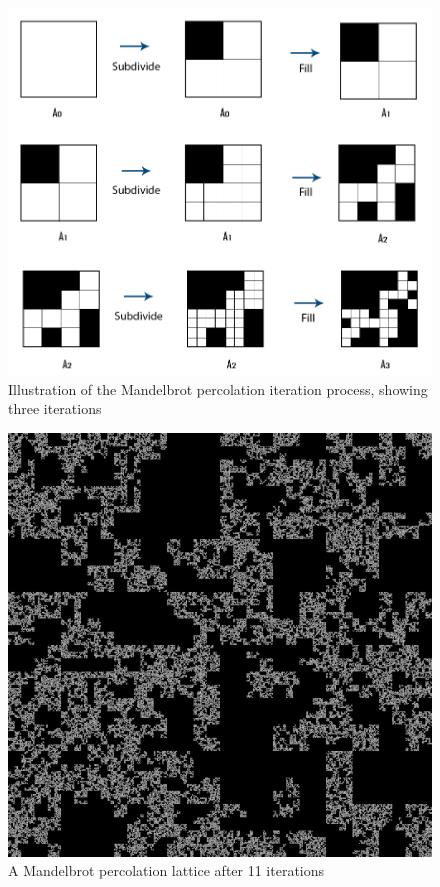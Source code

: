 \begin{figure}[H]
  \includegraphics[width=\linewidth]{Images/mandelbrot_process.png}
  \caption{Illustration of the Mandelbrot percolation iteration process, showing three iterations}
  \label{fig:mandelbrot_process}
\end{figure}



\begin{figure}[H]
  \includegraphics[width=\linewidth]{Images/mandelbrot_lattice.png}
  \caption{A Mandelbrot percolation lattice after 11 iterations}
  \label{fig:mandelbrot_lattice}
\end{figure}



